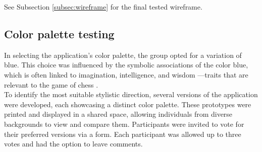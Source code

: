 See Subsection \ref{subsec:wireframe} for the final tested wireframe.



\subsection{Color palette testing}
\label{subsubsec:color-palette}

In selecting the application’s color palette, the group opted for a variation of blue. This choice was influenced by the symbolic associations of the color blue, which is often linked to imagination, intelligence, and wisdom \cite{blue}—traits that are relevant to the game of chess \cite{chess:ppqty, chess:chess-and-creativity}. \\

To identify the most suitable stylistic direction, several versions of the application were developed, each showcasing a distinct color palette. These prototypes were printed and displayed in a shared space, allowing individuals from diverse backgrounds to view and compare them. Participants were invited to vote for their preferred versions via a form. Each participant was allowed up to three votes and had the option to leave comments.